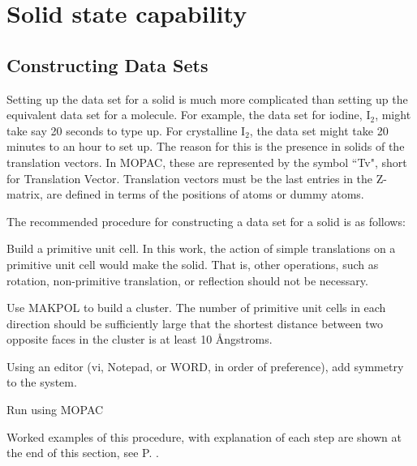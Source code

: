 \section{Solid state capability}\label{solid-state}

\subsection{Constructing Data Sets}
Setting up the data set for a solid is much more complicated than
setting up the equivalent data set for a molecule. For example,
the data set for iodine, I$_2$, might take say 20 seconds to type
up. For crystalline I$_2$, the data set might take 20 minutes to
an hour to set up. The reason for this is the presence in solids
of the translation vectors. In MOPAC, these are represented by the
symbol ``Tv", short for Translation Vector. Translation vectors
must be the last entries in the Z-matrix, are defined in terms of
the positions of atoms or dummy atoms.

The recommended procedure for constructing a data set for a solid
is as follows:

Build a primitive unit cell. In this work, the action of simple
translations on a primitive unit cell would make the solid. That
is, other operations, such as rotation, non-primitive translation,
or reflection should not be necessary.

Use MAKPOL to build a cluster. The number of primitive unit cells
in each direction should be sufficiently large that the shortest
distance between two opposite faces in the cluster is at least 10
\AA ngstroms.

Using an editor (vi, Notepad, or WORD, in order of preference),
add symmetry to the system.

Run using MOPAC

Worked examples of this procedure, with explanation of each step
are shown at the end of this section, see P. \pageref{diamond}.


